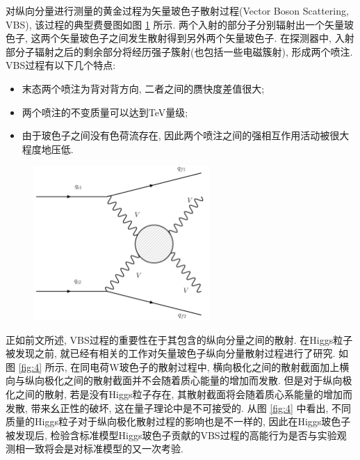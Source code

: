 \documentclass{SCIS2020cn}
\begin{document}
对纵向分量进行测量的黄金过程为矢量玻色子散射过程(Vector Boson Scattering, VBS), 该过程的典型费曼图如图 \ref{fig:3} 所示. 两个入射的部分子分别辐射出一个矢量玻色子, 这两个矢量玻色子之间发生散射得到另外两个矢量玻色子. 在探测器中, 入射部分子辐射之后的剩余部分将经历强子簇射(也包括一些电磁簇射), 形成两个喷注. VBS过程有以下几个特点: 

\begin{itemize}
\item 末态两个喷注为背对背方向, 二者之间的赝快度差值很大;
\item 两个喷注的不变质量可以达到TeV量级;
\item 由于玻色子之间没有色荷流存在, 因此两个喷注之间的强相互作用活动被很大程度地压低.
\end{itemize}

\begin{figure}[ht!]
\centering
\includegraphics[width=2.65104in]{Figure-3.pdf}
\label{fig:3}
\end{figure}

正如前文所述, VBS过程的重要性在于其包含的纵向分量之间的散射. 在Higgs粒子被发现之前, 就已经有相关的工作对矢量玻色子纵向分量散射过程进行了研究. 如图 \ref{fig:4} 所示, 在同电荷W玻色子的散射过程中, 横向极化之间的散射截面加上横向与纵向极化之间的散射截面并不会随着质心能量的增加而发散. 但是对于纵向极化之间的散射, 若是没有Higgs粒子存在, 其散射截面将会随着质心系能量的增加而发散, 带来幺正性的破坏, 这在量子理论中是不可接受的. 从图 \ref{fig:4} 中看出, 不同质量的Higgs粒子对于纵向极化散射过程的影响也是不一样的, 因此在Higgs玻色子被发现后, 检验含标准模型Higgs玻色子贡献的VBS过程的高能行为是否与实验观测相一致将会是对标准模型的又一次考验. 
\end{document}
